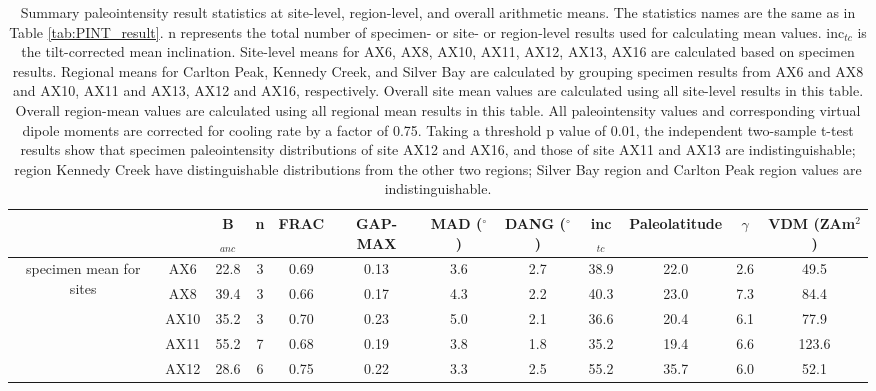 \documentclass[9pt,twoside,lineno]{pnas-new}
\begin{document}
\begin{table}[]
\centering
\caption{\footnotesize{Summary paleointensity result statistics at site-level, region-level, and overall arithmetic means. The statistics names are the same as in Table \ref{tab:PINT_result}}. n represents the total number of specimen- or site- or region-level results used for calculating mean values. inc$_{tc}$ is the tilt-corrected mean inclination. Site-level means for AX6, AX8, AX10, AX11, AX12, AX13, AX16 are calculated based on specimen results. Regional means for Carlton Peak, Kennedy Creek, and Silver Bay are calculated by grouping specimen results from AX6 and AX8 and AX10, AX11 and AX13, AX12 and AX16, respectively. Overall site mean values are calculated using all site-level results in this table. Overall region-mean values are calculated using all regional mean results in this table. All paleointensity values and corresponding virtual dipole moments are corrected for cooling rate by a factor of 0.75. Taking a threshold p value of 0.01, the independent two-sample t-test results show that specimen paleointensity distributions of site AX12 and AX16, and those of site AX11 and AX13 are indistinguishable; region Kennedy Creek have distinguishable distributions from the other two regions; Silver Bay region and Carlton Peak region values are indistinguishable.}
\begin{tabular}{cccccccccccc}
                                           &               & B$_{anc}$ & n  & FRAC & GAP-MAX & MAD ($^\circ$) & DANG ($^\circ$) & inc$_{tc}$ & Paleolatitude & $\gamma$ & VDM (ZAm$^2$) \\ \hline
\multirow{7}{*}{specimen mean for sites}   & AX6           & 22.8      & 3  & 0.69 & 0.13    & 3.6            & 2.7             & 38.9       & 22.0          & 2.6      & 49.5          \\
                                           & AX8           & 39.4      & 3  & 0.66 & 0.17    & 4.3            & 2.2             & 40.3       & 23.0          & 7.3      & 84.4          \\
                                           & AX10          & 35.2      & 3  & 0.70 & 0.23    & 5.0            & 2.1             & 36.6       & 20.4          & 6.1      & 77.9          \\
                                           & AX11          & 55.2      & 7  & 0.68 & 0.19    & 3.8            & 1.8             & 35.2       & 19.4          & 6.6      & 123.6         \\
                                           & AX12          & 28.6      & 6  & 0.75 & 0.22    & 3.3            & 2.5             & 55.2       & 35.7          & 6.0      & 52.1          \\

\end{tabular}
\end{table}
\end{document}
